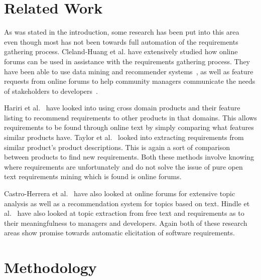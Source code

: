 \documentclass[conference]{IEEEtran}
\begin{document}
\section{Related Work}

As was stated in the introduction, some research has been put into this area~\cite{Ambriola:1997:PNL}
even though most
has not been towards full automation of the requirements gathering process. Cleland-Huang et al.
have extensively studied how online forums can be used in assistance with the requirements gathering
process. They have been able to use data mining and recommender systems~\cite{2008}, as well as
feature requests from online forums to help community managers communicate the needs of stakeholders
to developers~\cite{Cleland-HuangDDC09}.

Hariri et al.~\cite{HaririCMCM13} have looked into using cross domain products and their feature
listing to recommend requirements to other products in that domains. This allows requirements to
be found through online text by simply comparing what features similar products have. Taylor et
al.~\cite{Taylor} looked into extracting requirements from similar product's product descriptions.
This is again a sort of comparison between products to find new requirements. Both these methods
involve knowing where requirements are unfortunately and do not solve the issue of pure
open text requirements mining which is found is online forums.

Castro-Herrera et al.~\cite{Castro-Herrera:2009:RSD} have also looked at online forums for
extensive topic analysis as well as a recommendation system for topics based on text. Hindle et
al.~\cite{hindle} have also looked at topic extraction from free text and requirements as to
their meaningfulness to managers and developers. Again both of these research areas show promise
towards automatic elicitation of software requirements.

\section{Methodology}
\end{document}
